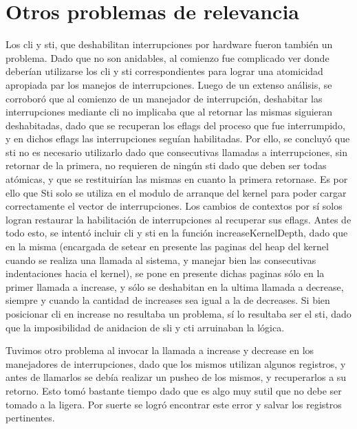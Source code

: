 \documentclass[10pt,a4paper]{article}
\begin{document}
\section{Otros problemas de relevancia}
	Los cli y sti, que deshabilitan interrupciones por hardware fueron tambi\'en un problema. Dado que no son anidables, al comienzo fue complicado ver donde deber\'ian utilizarse los cli y sti correspondientes para lograr una atomicidad apropiada par los manejos de interrupciones. Luego de un extenso an\'alisis, se corrobor\'o que al comienzo de un manejador de interrupci\'on, deshabitar las interrupciones mediante cli no implicaba que al retornar las mismas siguieran deshabitadas, dado que se recuperan los eflags del proceso que fue interrumpido, y en dichos eflags las interrupciones segu\'ian habilitadas. Por ello, se concluy\'o que sti no es necesario utilizarlo dado que consecutivas llamadas a interrupciones, sin retornar de la primera, no requieren de ning\'un sti dado que deben ser todas at\'omicas, y que se restituir\'ian las mismas en cuanto la primera retornase. Es por ello que Sti solo se utiliza en el modulo de arranque del kernel para poder cargar correctamente el vector de interrupciones. Los cambios de contextos por s\'i solos logran restaurar la habilitaci\'on de interrupciones al recuperar sus eflags. Antes de todo esto, se intent\'o incluir cli y sti en la funci\'on increaseKernelDepth, dado que en la misma (encargada de setear en presente las paginas del heap del kernel cuando se realiza una llamada al sistema, y manejar bien las consecutivas indentaciones hacia el kernel), se pone en presente dichas paginas s\'olo en la primer llamada a increase, y s\'olo se deshabitan en la ultima llamada a decrease, siempre y cuando la cantidad de increases sea igual a la de decreases. Si bien posicionar cli en increase no resultaba un problema, s\'i lo resultaba ser el sti, dado que la imposibilidad de anidacion de sli y cti arruinaban la l\'ogica.

Tuvimos otro problema al invocar la llamada a increase y decrease en los manejadores de interrupciones, dado que los mismos utilizan algunos registros, y antes de llamarlos se deb\'ia realizar un pusheo de los mismos, y recuperarlos a su retorno. Esto tom\'o bastante tiempo dado que es algo muy sutil que no debe ser tomado a la ligera. Por suerte se logr\'o encontrar este error y salvar los registros pertinentes.
\end{document}
